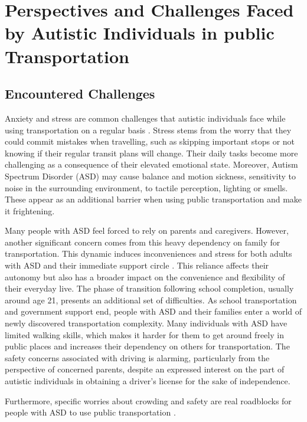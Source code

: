 \section{Perspectives and Challenges Faced by Autistic Individuals in public Transportation}
    
\subsection{Encountered Challenges}

Anxiety and stress are common challenges that autistic individuals face while using transportation on a regular basis \cite{2020ExperiencesYoungAutistic}. Stress stems from the worry that they could commit mistakes when travelling, such as skipping important stops or not knowing if their regular transit plans will change. Their daily tasks become more challenging as a consequence of their elevated emotional state.  Moreover, Autism Spectrum Disorder (ASD) may cause balance and motion sickness, sensitivity to noise in the surrounding environment, to tactile perception, lighting or smells. These appear as an additional barrier when using public transportation and make it frightening.

Many people with ASD feel forced to rely on parents and caregivers. However, another significant concern comes from this heavy dependency on family for transportation. This dynamic induces inconveniences and stress for both adults with ASD and their immediate support circle \cite{2015DetourRightPlace}. This reliance affects their autonomy but also has a broader impact on the convenience and flexibility of their everyday live. The phase of transition following school completion, usually around age 21, presents an additional set of difficulties. As school transportation and government support end,  people with ASD and their families enter a world of newly discovered transportation complexity. Many individuals with ASD have limited walking skills, which makes it harder for them to get around freely in public places and increases their dependency on others for transportation. The safety concerns associated with driving is alarming, particularly from the perspective of concerned parents, despite an expressed interest on the part of autistic individuals in obtaining a driver's license for the sake of independence. 

Furthermore, specific worries about crowding and safety are real roadblocks for people with ASD to use public transportation \cite{2015ViewpointsAdultsAutism}.  


